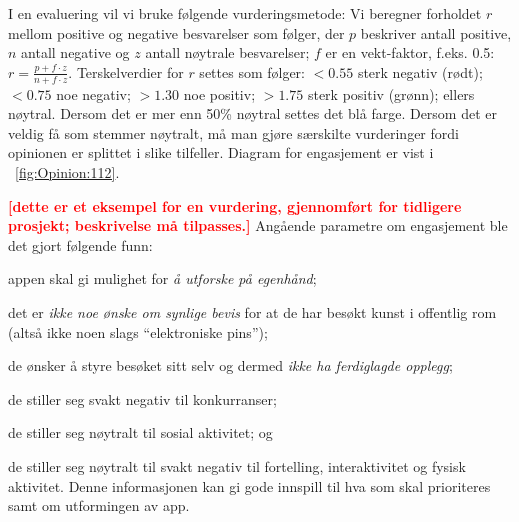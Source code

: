 \documentclass[11pt,english]{nik}
\newcommand{\WVL}[1]{\textbf{\textcolor{red}{#1}}}
\begin{document}
 







I en evaluering vil vi bruke følgende vurderingsmetode:
Vi beregner forholdet \(r\) mellom positive og negative besvarelser som
følger, der \(p\) beskriver antall positive, \(n\) antall negative og \(z\) antall nøytrale besvarelser; \(f\) er en vekt-faktor, f.eks. 0.5: \(r=\frac{p+f\cdot z}{n+f\cdot z}\).
Terskelverdier for \(r\) settes som følger: \(<0.55\)
sterk negativ (rødt);  \(<0.75\) noe negativ; \(>1.30\) noe
positiv;  \(>1.75\) sterk positiv (grønn); ellers nøytral. Dersom det
er mer enn 50\% nøytral settes det blå farge. Dersom det er veldig få
som stemmer nøytralt, må man gjøre særskilte vurderinger fordi
opinionen er splittet i slike tilfeller. 
Diagram for engasjement er vist i \figurename~\ref{fig:Opinion:112}.


\WVL{[dette er et eksempel for en vurdering, gjennomført for tidligere prosjekt; beskrivelse må tilpasses.]}
Angående parametre om engasjement ble det gjort følgende funn: 
\begin{enumerate*}[label={\alph*)},ref=\alph*]
\item appen skal gi mulighet for \emph{å utforske på egenhånd}; 
\item det er \emph{ikke noe ønske om synlige bevis} for at de har besøkt kunst i
offentlig rom (altså ikke noen slags {\textquotedblleft}elektroniske
pins{\textquotedblright}); 
\item de ønsker å styre besøket sitt selv og
dermed \emph{ikke ha ferdiglagde opplegg}; 
\item de stiller seg svakt
negativ til konkurranser; 
\item de stiller seg nøytralt til sosial
aktivitet; og 
\item de stiller seg nøytralt til svakt negativ til
fortelling, interaktivitet og fysisk aktivitet. 
Denne informasjonen kan gi gode innspill til hva som skal prioriteres
samt om utformingen av app.
\end{enumerate*}
\end{document}
